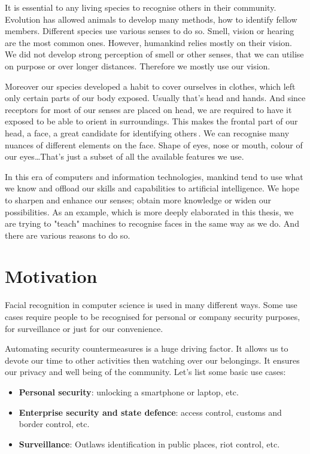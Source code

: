 It is essential to any living species to recognise others in their community. Evolution has allowed animals to develop many methods, how to identify fellow members. Different species use various senses to do so. Smell, vision or hearing are the most common ones. However, humankind relies mostly on their vision. We did not develop strong perception of smell or other senses, that we can utilise on purpose or over longer distances. Therefore we mostly use our vision.

Moreover our species developed a habit to cover ourselves in clothes, which left only certain parts of our body exposed. Usually that's head and hands. And since receptors for most of our senses are placed on head, we are required to have it exposed to be able to orient in surroundings. This makes the frontal part of our head, a face, a great candidate for identifying others\,\cite{history}. We can recognise many nuances of different elements on the face. Shape of eyes, nose or mouth, colour of our eyes\dots That's just a subset of all the available features we use.

In this era of computers and information technologies, mankind tend to use what we know and offload our skills and capabilities to artificial intelligence. We hope to sharpen and enhance our senses; obtain more knowledge or widen our possibilities. As an example, which is more deeply elaborated in this thesis, we are trying to "teach" machines to recognise faces in the same way as we do. And there are various reasons to do so.

\section{Motivation}
Facial recognition in computer science is used in many different ways. Some use cases require people to be recognised for personal or company security purposes, for surveillance or just for our convenience.

Automating security countermeasures is a huge driving factor. It allows us to devote our time to other activities then watching over our belongings. It ensures our privacy and well being of the community. Let's list some basic use cases:

\begin{itemize}
    \item \textbf{Personal security}: unlocking a smartphone or laptop, etc.
    \item \textbf{Enterprise security and state defence}: access control, customs and border control, etc.
    \item \textbf{Surveillance}: Outlaws identification in public places, riot control, etc.
\end{itemize}

